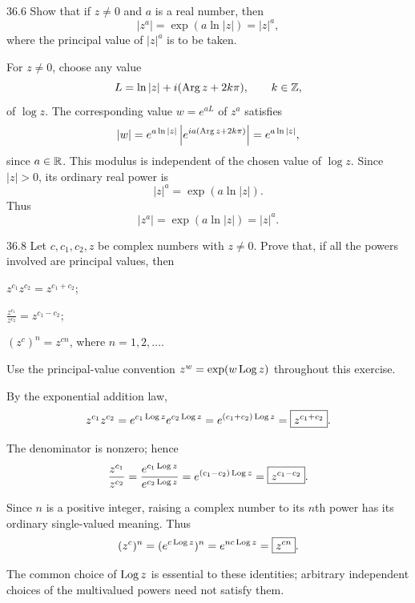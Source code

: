 \documentclass[11pt,oneside]{article}
\begin{document}

\begin{exercise}{36.6}
Show that if \(z\ne0\) and \(a\) is a real number, then
\[
    |z^a|=\exp(a\ln|z|)=|z|^a,
\]
where the principal value of \(|z|^a\) is to be taken.
\end{exercise}

\begin{solution}
For \(z\ne0\), choose any value
\[
    L=\ln|z|+i(\operatorname{Arg} z+2k\pi), \qquad k\in\mathbb{Z},
\]
of \(\log z\). The corresponding value \(w=e^{aL}\) of \(z^a\) satisfies
\[
    |w|=e^{a\ln|z|}\left|e^{ia(\operatorname{Arg} z+2k\pi)}\right|
    =e^{a\ln|z|},
\]
since \(a\in\mathbb{R}\). This modulus is independent of the chosen value of \(\log z\). Since \(|z|>0\), its ordinary real power is
\[
    |z|^a=\exp(a\ln|z|).
\]
Thus
\[
    \boxed{|z^a|=\exp(a\ln|z|)=|z|^a}.
\]
\end{solution}

\begin{exercise}{36.8}
Let \(c, c_1, c_2, z\) be complex numbers with \(z\ne0\). Prove that, if all the powers involved are principal values, then
\begin{exercisesubparts}
    \item \(z^{c_1}z^{c_2}=z^{c_1+c_2}\);
    \item \(\displaystyle\frac{z^{c_1}}{z^{c_2}}=z^{c_1-c_2}\);
    \item \((z^c)^n=z^{cn}\), where \(n=1, 2, \dots\).
\end{exercisesubparts}
\end{exercise}

\begin{solution}
Use the principal-value convention \(z^w=\exp(w\operatorname{Log} z)\) throughout this exercise.
\begin{exercisesubparts}
    \item By the exponential addition law,
    \[
        z^{c_1}z^{c_2}
        =e^{c_1\operatorname{Log} z}e^{c_2\operatorname{Log} z}
        =e^{(c_1+c_2)\operatorname{Log} z}
        =\boxed{z^{c_1+c_2}}.
    \]
    \item The denominator is nonzero; hence
    \[
        \frac{z^{c_1}}{z^{c_2}}
        =\frac{e^{c_1\operatorname{Log} z}}{e^{c_2\operatorname{Log} z}}
        =e^{(c_1-c_2)\operatorname{Log} z}
        =\boxed{z^{c_1-c_2}}.
    \]
    \item Since \(n\) is a positive integer, raising a complex number to its \(n\)th power has its ordinary single-valued meaning. Thus
    \[
        (z^c)^n=(e^{c\operatorname{Log} z})^n
        =e^{nc\operatorname{Log} z}=\boxed{z^{cn}}.
    \]
\end{exercisesubparts}
The common choice of \(\operatorname{Log} z\) is essential to these identities; arbitrary independent choices of the multivalued powers need not satisfy them.
\end{solution}
\end{document}
